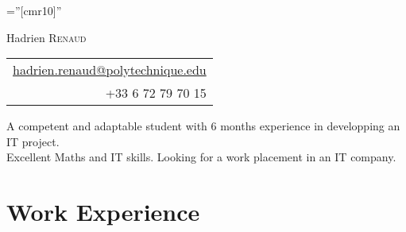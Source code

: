 \documentclass[a4paper,10pt]{article} %
\begin{document}
\pagestyle{empty} %

\font\fb=''[cmr10]'' %



\par{{\Huge Hadrien \textsc{Renaud}}\hfill
\begin{tabular}{r}
\href{mailto:hadrien.renaud@polytechnique.edu}{hadrien.renaud@polytechnique.edu}\\
+33 6 72 79 70 15
\end{tabular}
\bigskip\par} %
\vfill


A competent and adaptable student with 6 months experience in developping an IT project.\\
Excellent Maths and IT skills.
Looking for a work placement in an IT company.


\section{Work Experience}
\end{document}
